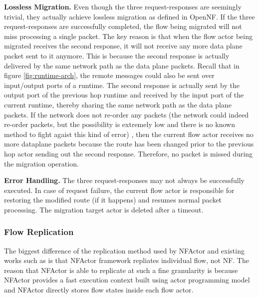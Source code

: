 \textbf{Lossless Migration.} Even though the three request-responses are seemingly trivial, they actually achieve lossless migration as defined in OpenNF. If the three request-responses are successfully completed, the flow being migrated will not miss processing a single packet. The key reason is that when the flow actor being migrated receives the second response, it will not receive any more data plane packet sent to it anymore. This is because the second response is actually delivered by the same network path as the data plane packets. Recall that in figure \ref{fig:runtime-arch}, the remote messages could also be sent over input/output ports of a runtime. The second response is actually sent by the output port of the previous hop runtime and received by the input port of the current runtime, thereby sharing the same network path as the data plane packets. If the network does not re-order any packets (the network could indeed re-order packets, but the possibility is extremely low and there is no known method to fight agaist this kind of error) , then the current flow actor receives no more dataplane packets because the route has been changed prior to the previous hop actor sending out the second response. Therefore, no packet is missed during the migration operation.

\textbf{Error Handling.} The three request-responses may not always be successfully executed. In case of request failure, the current flow actor is responsible for restoring the modified route (if it happens) and resumes normal packet processing. The migration target actor is deleted after a timeout.

\subsubsection{Flow Replication}

The biggest difference of the replication method used by NFActor and existing works such as \cite{sherry2015rollback} is that NFActor framework repliates individual flow, not NF. The reason that NFActor is able to replicate at such a fine granularity is because NFActor provides a fast execution context built using actor programming model and NFActor directly stores flow states inside each flow actor.

